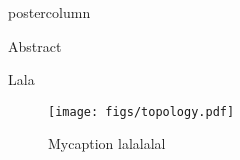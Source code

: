 \begin{frame}
\begin{columns}
	\begin{column}{.42\textwidth}
		\begin{beamercolorbox}[center]{postercolumn}
			\begin{minipage}{.98\textwidth}  %
				\parbox[t][\columnheight]{\textwidth}{ %
					\begin{myblock}{Abstract}
						
					\end{myblock}\vfill
					\vspace{-0.3em}
					\begin{myblock}{Lala}
						\begin{figure}
							\captionsetup{width=.9\linewidth}
							\texttt{[image: figs/topology.pdf]}
							\vspace{-1.8em}
							\caption{
								Mycaption lalalalal
							}
							\vspace{1em}
						\end{figure}


\end{myblock}}
\end{minipage}
\end{beamercolorbox}
\end{column}
\end{columns}
\end{frame}
